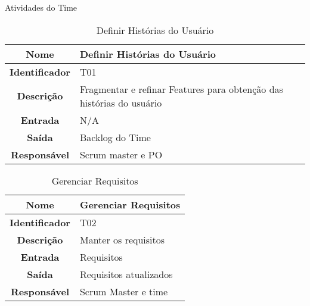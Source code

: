 {     \large{Atividades do Time\\}

              \begin{table}[H]
                \centering
                \caption{Definir Histórias do Usuário}
                \begin{tabular}{c|p{10cm}}
                    \hline
                    \textbf{Nome}            & Definir Histórias do Usuário\\
                    \hline
                    \textbf{Identificador} & T01\\
                    \hline
                    \textbf{Descrição}   & Fragmentar e refinar Features para obtenção das histórias do usuário
\\
                    \hline
                    \textbf{Entrada}           & N/A\\
                    \hline
                    \textbf{Saída}            &  Backlog do Time\\
                    \hline
                    \textbf{Responsável}            & Scrum master  e  PO\\
                    \hline
                \end{tabular}
            \end{table}

              \begin{table}[H]
                \centering
                \caption{Gerenciar Requisitos}
                \begin{tabular}{c|p{10cm}}
                    \hline
                    \textbf{Nome}            & Gerenciar Requisitos\\
                    \hline
                    \textbf{Identificador} & T02\\
                    \hline
                    \textbf{Descrição}   & Manter os requisitos\\
                    \hline
                    \textbf{Entrada}           & Requisitos\\
                    \hline
                    \textbf{Saída}            &  Requisitos atualizados\\
                    \hline
                    \textbf{Responsável}            & Scrum Master e time \\
                    \hline
                \end{tabular}
            \end{table}


}
